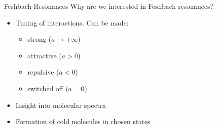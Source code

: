 \begin{frame}[t]{Feshbach Resonances}
    Why are we interested in Feshbach resonances?
    \begin{itemize}
      \item<2-> Tuning of interactions. Can be made:
      \begin{itemize}
        \item strong ($a\rightarrow \pm\infty$)
        \item attractive ($a>0$)
        \item repulsive ($a<0$)
        \item switched off ($a=0$)
      \end{itemize}
      \item<3-> Insight into molecular spectra
      \item<4-> Formation of cold molecules in chosen states
      \end{itemize}
\end{frame}

